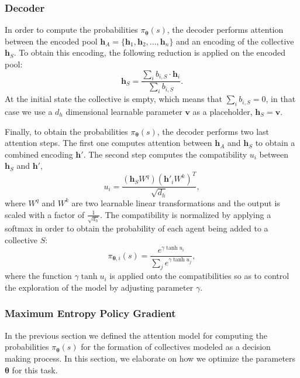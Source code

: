 \documentclass{article}
\theoremstyle{definition}
\begin{document}
\subsubsection{Decoder}

In order to compute the probabilities $\pi_{\boldsymbol{\theta}}(s)$, the decoder performs attention between the encoded pool $\boldsymbol{h}_{A} = \{ \boldsymbol{h}_1, \boldsymbol{h}_2, ..., \boldsymbol{h}_n\}$ and an encoding of the collective $\boldsymbol{h}_{S}$. To obtain this encoding, the following reduction is applied on the encoded pool:
\begin{equation}
    \label{encodedS}
    \boldsymbol{h}_{S} = \frac{\sum_{i} b_{i, S}  \cdot \boldsymbol{h}_{i}}{\sum_{i} b_{i, S}}.
\end{equation}
At the initial state the collective is empty, which means that ${\sum_{i} b_{i, S}} = 0$, in that case we use a $d_h$ dimensional learnable parameter $\boldsymbol{v}$ as a placeholder, $\boldsymbol{h}_S = \boldsymbol{v}$.

Finally, to obtain the probabilities $\pi_{\boldsymbol{\theta}}(s)$, the decoder performs two last attention steps. The first one computes attention between ${\boldsymbol{h}_{A}}$ and $\boldsymbol{h}_{S}$ to obtain a combined encoding $\boldsymbol{h}'$. The second step computes the compatibility $u_i$ between $\boldsymbol{h}_S$ and $\boldsymbol{h}'$,
\begin{equation}
    u_{i} = \frac{(\boldsymbol{h}_S W^q ) (\boldsymbol{h}'_{i} W^k)^T} {\sqrt{d_h}} ,
\end{equation}
where $W^q$ and $W^k$ are two learnable linear transformations and the output is scaled with a factor of $\frac{1}{\sqrt{d_h}}$. The compatibility is normalized by applying a softmax in order to obtain the probability of each agent being added to a collective $S$:
\begin{equation}
    \pi_{\boldsymbol{\theta}, i}(s) = \frac{e^{\gamma \tanh{u_{i}}}} {\sum_{j} e^{\gamma \tanh{u_{j}}}} ,
\end{equation}
where the function $\gamma \tanh u_i$ is applied onto the compatibilities so as to control the exploration of the model by adjusting parameter $\gamma$.

\subsubsection{Maximum Entropy Policy Gradient}

In the previous section we defined the attention model for computing the probabilities $\pi_{\boldsymbol{\theta}}(s)$ for the formation of collectives modeled as a decision making process.
In this section, we elaborate on how we optimize the parameters $\boldsymbol{\theta}$ for this task.
\end{document}

